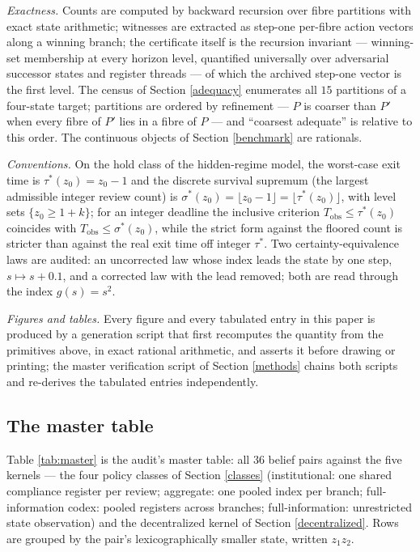 \documentclass[10pt,twocolumn]{article}
\theoremstyle{definition}
\begin{document}
\emph{Exactness.} Counts are computed by backward recursion over fibre
partitions with exact state arithmetic; witnesses are extracted as step-one per-fibre action vectors along a winning branch; the certificate itself is the recursion invariant --- winning-set membership at every horizon level, quantified universally over adversarial successor states and register threads --- of which the archived step-one vector is the first level. The census of
Section \ref{adequacy} enumerates all \(15\) partitions of a four-state
target; partitions are ordered by refinement --- \(P\) is coarser than
\(P'\) when every fibre of \(P'\) lies in a fibre of \(P\) --- and
``coarsest adequate'' is relative to this order. The continuous objects of Section \ref{benchmark} are rationals.

\emph{Conventions.} On the hold class of the hidden-regime model, the
worst-case exit time is \(\tau^{*}(z_0) = z_0 - 1\) and the discrete
survival supremum (the largest admissible integer review count) is
\(\sigma^{*}(z_0) = \lfloor z_0 - 1 \rfloor = \lfloor \tau^{*}(z_0)
\rfloor\), with level sets \(\{z_0 \ge 1 + k\}\); for an integer deadline
the inclusive criterion \(T_{\mathrm{obs}} \le \tau^{*}(z_0)\) coincides
with \(T_{\mathrm{obs}} \le \sigma^{*}(z_0)\), while the strict form
against the floored count is stricter than against the real exit time off
integer \(\tau^{*}\). Two
certainty-equivalence laws are audited: an uncorrected law whose index
leads the state by one step, \(s \mapsto s + 0.1\), and a corrected law
with the lead removed; both are read through the index \(g(s) = s^{2}\).

\emph{Figures and tables.} Every figure and every tabulated entry in
this paper is produced by a generation script that first recomputes the
quantity from the primitives above, in exact rational arithmetic, and
asserts it before drawing or printing; the master verification script of
Section \ref{methods} chains both scripts and re-derives the tabulated
entries independently.

\subsection{The master table}\label{master}

Table \ref{tab:master} is the audit's master table: all 36 belief pairs
against the five kernels --- the four policy classes of Section
\ref{classes} (institutional: one shared compliance register per
review; aggregate: one pooled index per branch; full-information codex:
pooled registers across branches; full-information: unrestricted state
observation) and the decentralized kernel of Section
\ref{decentralized}. Rows are grouped by the pair's lexicographically
smaller state, written \(z_1 z_2\).
\end{document}
